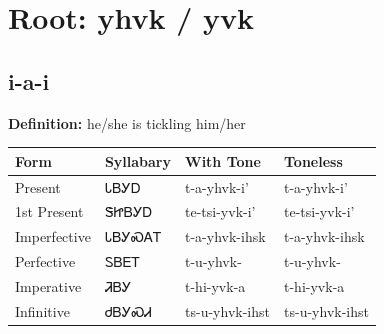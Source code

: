 \documentclass{article}%
\begin{document}
%
\normalsize%
\section*{Root: yhvk / yvk}%
\subsection*{i-a-i}%
\textbf{Definition: }%
he/she is tickling him/her%
\\[0.5em]%
\begin{tabular}{|l|l|l|l|}%
\hline%
\textbf{Form}&\textbf{Syllabary}&\textbf{With Tone}&\textbf{Toneless}\\%
\hline%
Present&ᏓᏴᎩᎠ&t{-}a{-}yhvk{-}i'&t{-}a{-}yhvk{-}i'\\%
1st Present&ᏕᏥᏴᎩᎠ&te{-}tsi{-}yvk{-}i'&te{-}tsi{-}yvk{-}i'\\%
Imperfective&ᏓᏴᎩᏍᎪᎢ&t{-}a{-}yhvk{-}ihsk&t{-}a{-}yhvk{-}ihsk\\%
Perfective&ᏚᏴᎬᎢ&t{-}u{-}yhvk{-}&t{-}u{-}yhvk{-}\\%
Imperative&ᏘᏴᎩ&t{-}hi{-}yvk{-}a&t{-}hi{-}yvk{-}a\\%
Infinitive&ᏧᏴᎩᏍᏗ&ts{-}u{-}yhvk{-}ihst&ts{-}u{-}yhvk{-}ihst\\%
\hline%
\end{tabular}%
\\[1em]%
\end{document}
